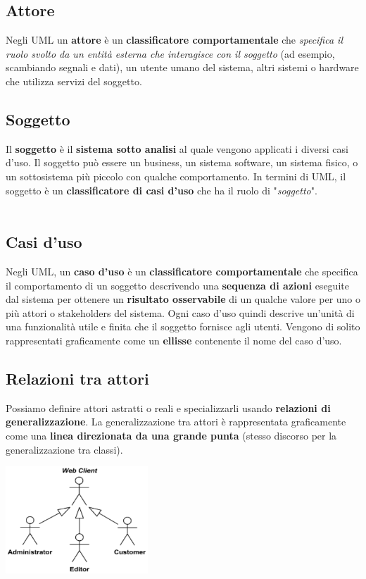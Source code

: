 \documentclass{article}
\begin{document}
\subsection*{Attore}
\large

Negli UML un \textbf{attore} è un \textbf{classificatore comportamentale} che \textit{specifica il ruolo svolto da un entità esterna che interagisce con il soggetto} (ad esempio, scambiando segnali e dati), un utente umano del sistema, altri sistemi o hardware che utilizza servizi del soggetto.

\subsection*{Soggetto}
\large

Il \textbf{soggetto} è il \textbf{sistema sotto analisi} al quale vengono applicati i diversi casi d'uso. Il soggetto può essere un business, un sistema software, un sistema fisico, o un sottosistema più piccolo con qualche comportamento. In termini di UML, il soggetto è un \textbf{classificatore di casi d'uso} che ha il ruolo di "\textit{soggetto}". \\ \\

\subsection*{Casi d'uso}
\large

Negli UML, un \textbf{caso d'uso} è un \textbf{classificatore comportamentale} che specifica il comportamento di un soggetto descrivendo una \textbf{sequenza di azioni} eseguite dal sistema per ottenere un \textbf{risultato osservabile} di un qualche valore per uno o più attori o stakeholders del sistema. Ogni caso d'uso quindi descrive un'unità di una funzionalità utile e finita che il soggetto fornisce agli utenti. Vengono di solito rappresentati graficamente come un \textbf{ellisse} contenente il nome del caso d'uso.

\subsection*{Relazioni tra attori}
\large

Possiamo definire attori astratti o reali e specializzarli usando \textbf{relazioni di generalizzazione}. La generalizzazione tra attori è rappresentata graficamente come una \textbf{linea direzionata da una grande punta} (stesso discorso per la generalizzazione tra classi).
\begin{center}
    \includegraphics[width=0.4\textwidth]{foto 2.png}
\end{center}
\end{document}
